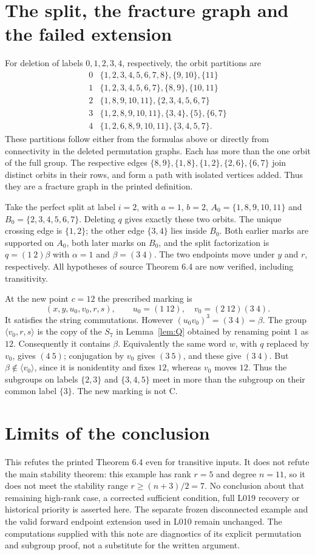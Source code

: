 \documentclass[11pt,a4paper]{article}
\newcommand{\gen}[1]{\langle#1\rangle}\newcommand{\eps}{\varepsilon}
\begin{document}
\section{The split, the fracture graph and the failed extension}
For deletion of labels $0,1,2,3,4$, respectively, the orbit partitions are
\[
\begin{array}{c|l}
0&\{1,2,3,4,5,6,7,8\},\{9,10\},\{11\}\\
1&\{1,2,3,4,5,6,7\},\{8,9\},\{10,11\}\\
2&\{1,8,9,10,11\},\{2,3,4,5,6,7\}\\
3&\{1,2,8,9,10,11\},\{3,4\},\{5\},\{6,7\}\\
4&\{1,2,6,8,9,10,11\},\{3,4,5,7\}.
\end{array}
\]
These partitions follow either from the formulas above or directly from
connectivity in the deleted permutation graphs. Each has more than the
one orbit of the full group. The respective edges
$\{8,9\},\{1,8\},\{1,2\},\{2,6\},\{6,7\}$
join distinct orbits in their rows, and form a path with isolated vertices
added. Thus they are a fracture graph in the printed definition.

Take the perfect split at label $i=2$, with
$a=1$, $b=2$, $A_0=\{1,8,9,10,11\}$ and
$B_0=\{2,3,4,5,6,7\}$. Deleting $q$ gives exactly these two orbits.
The unique crossing edge is $\{1,2\}$; the other edge $\{3,4\}$ lies
inside $B_0$. Both earlier marks are supported on $A_0$, both later
marks on $B_0$, and the split factorization is
$q=(1\ 2)\beta$ with $\alpha=1$ and $\beta=(3\ 4)$.
The two endpoints move under $y$ and $r$, respectively.
All hypotheses of source Theorem 6.4 are now verified, including transitivity.

At the new point $c=12$ the prescribed marking is
\[
 (x,y,u_0,v_0,r,s),\qquad
 u_0=(1\ 12),\quad v_0=(2\ 12)(3\ 4).
\]
It satisfies the string commutations. However
$(u_0v_0)^3=(3\ 4)=\beta$.
The group $\gen{v_0,r,s}$ is the copy of the $S_7$ in
Lemma~\ref{lem:Q} obtained by renaming point $1$ as $12$.
Consequently it contains $\beta$. Equivalently the same word $w$, with
$q$ replaced by $v_0$, gives $(4\ 5)$; conjugation by $v_0$ gives
$(3\ 5)$, and these give $(3\ 4)$.
But $\beta\notin\gen{v_0}$, since it is nonidentity and fixes $12$,
whereas $v_0$ moves $12$.
Thus the subgroups on labels $\{2,3\}$ and $\{3,4,5\}$ meet in
more than the subgroup on their common label $\{3\}$.
The new marking is not C.

\section{Limits of the conclusion}
This refutes the printed Theorem 6.4 even for transitive inputs.
It does not refute the main stability theorem: this example has rank
$r=5$ and degree $n=11$, so it does not meet the stability range
$r\geq(n+3)/2=7$. No conclusion about that remaining high-rank case,
a corrected sufficient condition, full L019 recovery or historical
priority is asserted here. The separate frozen disconnected example and
the valid forward endpoint extension used in L010 remain unchanged.
The computations supplied with this note are diagnostics of its explicit
permutation and subgroup proof, not a substitute for the written argument.
\end{document}
